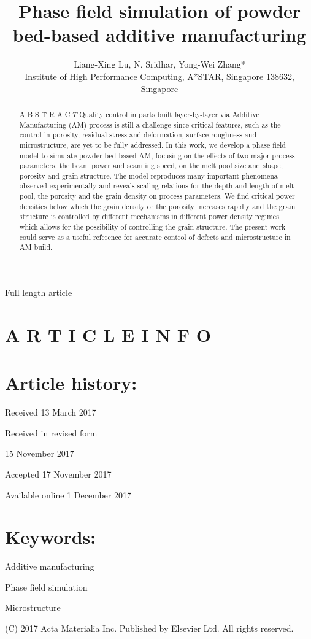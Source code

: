 \documentclass[10pt]{article}
\title{Phase field simulation of powder bed-based additive manufacturing }
\author{Liang-Xing Lu, N. Sridhar, Yong-Wei Zhang*\\
Institute of High Performance Computing, A*STAR, Singapore 138632, Singapore}
\date{}
\begin{document}
\maketitle
Full length article



\section*{A R T I C L E I N F O}
\section*{Article history:}
Received 13 March 2017

Received in revised form

15 November 2017

Accepted 17 November 2017

Available online 1 December 2017

\section*{Keywords:}
Additive manufacturing

Phase field simulation

Microstructure

\begin{abstract}
A B S T R A C $T$ Quality control in parts built layer-by-layer via Additive Manufacturing (AM) process is still a challenge since critical features, such as the control in porosity, residual stress and deformation, surface roughness and microstructure, are yet to be fully addressed. In this work, we develop a phase field model to simulate powder bed-based AM, focusing on the effects of two major process parameters, the beam power and scanning speed, on the melt pool size and shape, porosity and grain structure. The model reproduces many important phenomena observed experimentally and reveals scaling relations for the depth and length of melt pool, the porosity and the grain density on process parameters. We find critical power densities below which the grain density or the porosity increases rapidly and the grain structure is controlled by different mechanisms in different power density regimes which allows for the possibility of controlling the grain structure. The present work could serve as a useful reference for accurate control of defects and microstructure in AM build.
\end{abstract}

(C) 2017 Acta Materialia Inc. Published by Elsevier Ltd. All rights reserved.
\end{document}

